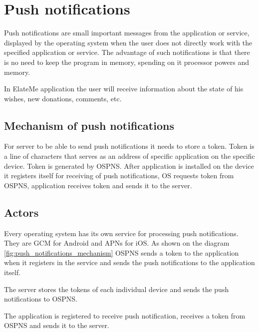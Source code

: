 \section{Push notifications}
Push notifications are small important messages from the application or service, displayed by the operating system when
the user does not directly work with the specified application or service. The advantage of such notifications is that
there is no need to keep the program in memory, spending on it processor powers and memory.

In ElateMe application the user will receive information about the state of his wishes, new donations, comments, etc.

\subsection{Mechanism of push notifications}


For server to be able to send push notifications it needs to store a token. Token is a line of characters that serves
as an address of specific application on the specific device. Token is generated by \ac{OSPNS}. After application is
installed on the device it registers itself for receiving of push notifications, OS requests token from \ac{OSPNS},
application receives token and sends it to the server.

\subsection{Actors}

\begin{itemize}
Every operating system has its own service for processing push notifications. They are \ac{GCM} for Android and \ac{APNs}
for iOS. As shown on the diagram \ref{fig:push_notifications_mechanism} OSPNS sends a token to the application
when it registers in the service and sends the push notifications to the application itself.

The server stores the tokens of each individual device and sends the push notifications to OSPNS.

The application is registered to receive push notification, receives a token from OSPNS and sends it to the server.
\end{itemize}






